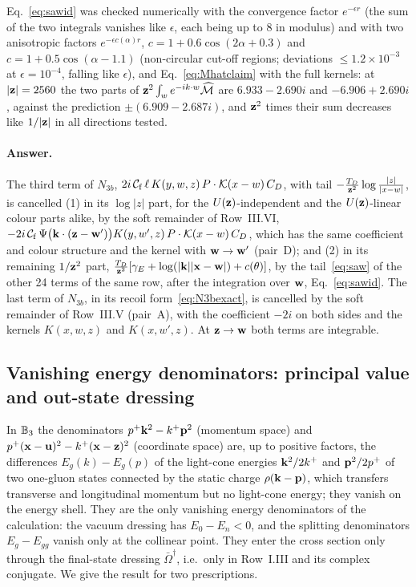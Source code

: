 Eq.~\eqref{eq:sawid} was checked numerically with the convergence factor $e^{-\epsilon r}$ (the sum of the two integrals vanishes like $\epsilon$, each being up to $8$ in modulus) and with two anisotropic factors $e^{-\epsilon c(\alpha)r}$, $c=1+0.6\cos(2\alpha+0.3)$ and $c=1+0.5\cos(\alpha-1.1)$ (non-circular cut-off regions; deviations $\le1.2\times10^{-3}$ at $\epsilon=10^{-4}$, falling like $\epsilon$), and Eq.~\eqref{eq:Mhatclaim} with the full kernels: at $|\mathbf{z}|=2560$ the two parts of $\mathbf{z}^2\int_we^{-ik\cdot w}\widehat{\mathcal M}$ are $6.933-2.690i$ and $-6.906+2.690i$, against the prediction $\pm(6.909-2.687i)$, and $\mathbf{z}^2$ times their sum decreases like $1/|\mathbf{z}|$ in all directions tested.

\paragraph{Answer.} The third term of $N_{3b}$, $2i\,\mathcal C_{\rm f}\,\ell\,K(y,w,z)\,P\cdot\mathcal{K}(x-w)\,C_D$, with tail $-\frac{T_D}{\mathbf{z}^2}\log\frac{|z|}{|x-w|}$, is cancelled (1) in its $\log|z|$ part, for the $U(\mathbf{z})$-independent and the $U(\mathbf{z})$-linear colour parts alike, by the soft remainder of Row~III.VI, $-2i\,\mathcal C_{\rm f}\,\Psi\big(\mathbf{k}\cdot(\mathbf{z}-\mathbf{w}')\big)K(y,w',z)\,P\cdot\mathcal{K}(x-w)\,C_D$, which has the same coefficient and colour structure and the kernel with $\mathbf{w}\to\mathbf{w}'$ (pair~D); and (2) in its remaining $1/\mathbf{z}^2$ part, $\frac{T_D}{\mathbf{z}^2}[\gamma_E+\log(|\mathbf{k}||\mathbf{x}-\mathbf{w}|)+c(\theta)]$, by the tail~\eqref{eq:saw} of the other 24 terms of the same row, after the integration over $\mathbf{w}$, Eq.~\eqref{eq:sawid}. The last term of $N_{3b}$, in its recoil form~\eqref{eq:N3bexact}, is cancelled by the soft remainder of Row~III.V (pair~A), with the coefficient $-2i$ on both sides and the kernels $K(x,w,z)$ and $K(x,w',z)$. At $\mathbf{z}\to\mathbf{w}$ both terms are integrable.

\subsection{Vanishing energy denominators: principal value and out-state dressing}\label{sec:fin_pv}

In $\mathbb{B}_3$ the denominators $p^+\mathbf{k}^2-k^+\mathbf{p}^2$ (momentum space) and $p^+(\mathbf{x}-\mathbf{u})^2-k^+(\mathbf{x}-\mathbf{z})^2$ (coordinate space) are, up to positive factors, the differences $E_g(k)-E_g(p)$ of the light-cone energies $\mathbf{k}^2/2k^+$ and $\mathbf{p}^2/2p^+$ of two one-gluon states connected by the static charge $\rho(\mathbf{k}-\mathbf{p})$, which transfers transverse and longitudinal momentum but no light-cone energy; they vanish on the energy shell. They are the only vanishing energy denominators of the calculation: the vacuum dressing has $E_0-E_n<0$, and the splitting denominators $E_g-E_{gg}$ vanish only at the collinear point. They enter the cross section only through the final-state dressing $\bar\Omega^\dagger$, i.e.\ only in Row~I.III and its complex conjugate. We give the result for two prescriptions.


